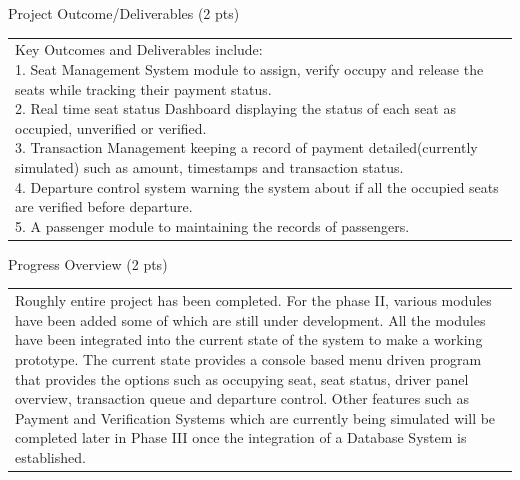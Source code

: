 \documentclass[12pt,a4paper]{article}
\newcommand{\sectiontitle}[1]{%
    {\color{GEUBlue}
    \fontsize{18}{22}\selectfont #1}
}
\newcommand{\instruction}[1]{%
    {\color{InstructionGrey}
    \fontsize{10.5}{13}\selectfont #1}
}
\newcommand{\answerbox}[2]{%
    \begin{tabularx}{\textwidth}{
        |>{\raggedright\arraybackslash}X|}
        \hline
        \parbox[t][#1][t]{\dimexpr\linewidth-12pt\relax}{
            \vspace{5pt}
            \fontsize{11}{13}\selectfont #2
        }\\
        \hline
    \end{tabularx}
}
\begin{document}
\newpage


\vspace*{0.30cm}

\sectiontitle{Project Outcome/Deliverables (2 pts)}

\vspace{0.05cm}


\vspace{0.35cm}

\answerbox{4cm}{Key Outcomes and Deliverables include:\\
1. Seat Management System module to assign, verify occupy and release the seats while tracking their payment status.\\
2. Real time seat status Dashboard displaying the status of each seat as occupied, unverified or verified.\\
3. Transaction Management keeping a record of payment detailed(currently simulated) such as amount, timestamps and transaction status.\\
4. Departure control system warning the system about if all the occupied seats are verified before departure.\\
5. A passenger module to maintaining the records of passengers.
}

\vspace{0.75cm}

\sectiontitle{Progress Overview (2 pts)}

\vspace{0.05cm}


\vspace{0.25cm}

\answerbox{3.25cm}{Roughly entire project has been completed. For the phase II, various modules have been added some of which are still under development. All the modules have been integrated into the current state of the system to make a working prototype. The current state provides a console based menu driven program that provides the options such as occupying seat, seat status, driver panel overview, transaction queue and departure control. Other features such as Payment and Verification Systems which are currently being simulated will be completed later in Phase III once the integration of a Database System is established. }
\newpage
\end{document}
